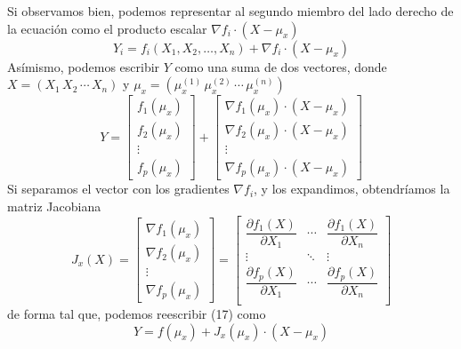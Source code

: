 \documentclass[a4paper, 10pt]{article}
\begin{document}
Si observamos bien, podemos representar al segundo miembro del lado derecho de la ecuación como
el producto escalar $\nabla f_i \cdot (X-\mu_x)$
\begin{equation}
    Y_i = f_i(X_1,X_2,\dots,X_n) + \nabla f_i \cdot (X-\mu_x)
\end{equation}
Asímismo, podemos escribir $Y$ como una suma de dos vectores, donde $X=\left(X_1\, X_2\, \cdots\, X_n\right)$ y
$\mu_x = \left(\mu_x^{(1)}\,\mu_x^{(2)}\,\cdots\, \mu_x^{(n)}\right)$
\begin{equation}
    Y = \begin{bmatrix}
        f_1(\mu_x) \\
        f_2(\mu_x) \\
        \vdots     \\
        f_p(\mu_x)
    \end{bmatrix} +
    \begin{bmatrix}
        \nabla f_1\left(\mu_x\right) \cdot (X-\mu_x) \\
        \nabla f_2\left(\mu_x\right) \cdot (X-\mu_x) \\
        \vdots                                       \\
        \nabla f_p\left(\mu_x\right) \cdot (X-\mu_x)
    \end{bmatrix}
\end{equation}
Si separamos el vector con los gradientes $\nabla f_i$, y los expandimos, obtendríamos la matriz Jacobiana
\begin{equation}
    J_x(X) = \begin{bmatrix}
        \nabla f_1\left(\mu_x\right) \\
        \nabla f_2\left(\mu_x\right) \\
        \vdots                       \\
        \nabla f_p\left(\mu_x\right)
    \end{bmatrix} = \begin{bmatrix}
        \dfrac{\partial f_1(X)}{\partial X_1} & \cdots & \dfrac{\partial f_1(X)}{\partial X_n} \\
        \vdots                                & \ddots & \vdots                                \\
        \dfrac{\partial f_p(X)}{\partial X_1} & \cdots & \dfrac{\partial f_p(X)}{\partial X_n} \\
    \end{bmatrix}
\end{equation}
de forma tal que, podemos reescribir (17) como
\begin{equation}
    Y = f(\mu_x) + J_x(\mu_x)\cdot (X-\mu_x)
\end{equation}
\end{document}
